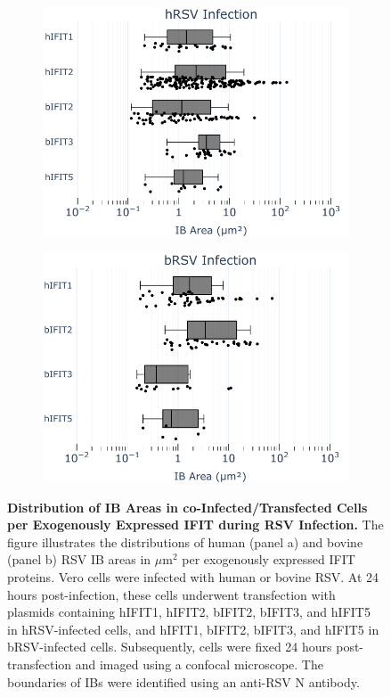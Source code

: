 \begin{figure}
    \begin{subfigure}{0.495\textwidth}
        \caption{}
        \includegraphics[width=1\linewidth]{09. Chapter 4/Figs/02. Overexpression/01. sizes-oe-hrsv.pdf} 
    \end{subfigure}
    \begin{subfigure}{0.495\textwidth}
        \caption{}
        \includegraphics[width=1\linewidth]{09. Chapter 4/Figs/02. Overexpression/02. sizes-oe-brsv.pdf}
    \end{subfigure}
    \caption[Distribution of IB Areas in co-Infected/Transfected Cells per Exogenously Expressed IFIT during RSV Infection.]{\textbf{Distribution of IB Areas in co-Infected/Transfected Cells per Exogenously Expressed IFIT during RSV Infection.} The figure illustrates the distributions of human (panel a) and bovine (panel b) RSV IB areas in \(\mu \mbox{m}^2\) per exogenously expressed IFIT proteins. Vero cells were infected with human or bovine RSV. At 24 hours post-infection, these cells underwent transfection with plasmids containing hIFIT1, hIFIT2, bIFIT2, bIFIT3, and hIFIT5 in hRSV-infected cells, and hIFIT1, bIFIT2, bIFIT3, and hIFIT5 in bRSV-infected cells. Subsequently, cells were fixed 24 hours post-transfection and imaged using a confocal microscope. The boundaries of IBs were identified using an anti-RSV N antibody.}

\end{figure}
